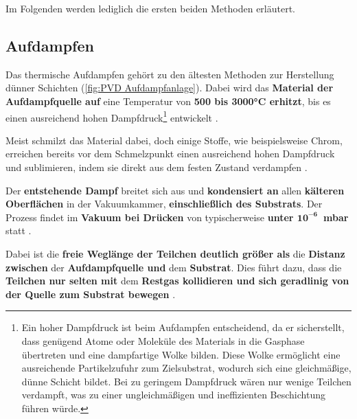 \documentclass{article} %
\begin{document}
Im Folgenden werden lediglich die ersten beiden Methoden erläutert.





\vspace{1em}

\subsection{Aufdampfen} %

Das thermische Aufdampfen gehört zu den ältesten Methoden zur Herstellung dünner Schichten (\autoref{fig:PVD Aufdampfanlage}). Dabei wird das \textbf{Material der Aufdampfquelle auf} eine Temperatur von \textbf{500 bis 3000°C erhitzt}, bis es einen ausreichend hohen Dampfdruck\footnote{Ein hoher Dampfdruck ist beim Aufdampfen entscheidend, da er sicherstellt, dass genügend Atome oder Moleküle des Materials in die Gasphase übertreten und eine dampfartige Wolke bilden. Diese Wolke ermöglicht eine ausreichende Partikelzufuhr zum Zielsubstrat, wodurch sich eine gleichmäßige, dünne Schicht bildet. Bei zu geringem Dampfdruck wären nur wenige Teilchen verdampft, was zu einer ungleichmäßigen und ineffizienten Beschichtung führen würde.} entwickelt \cite{keplinger2024}.

\vspace{1em}

Meist schmilzt das Material dabei, doch einige Stoffe, wie beispielsweise Chrom, erreichen bereits vor dem Schmelzpunkt einen ausreichend hohen Dampfdruck und sublimieren, indem sie direkt aus dem festen Zustand verdampfen \cite{keplinger2024}.

\vspace{1em}

Der \textbf{entstehende Dampf} breitet sich aus und \textbf{kondensiert an} allen \textbf{kälteren Oberflächen} in der Vakuumkammer, \textbf{einschließlich des Substrats}. Der Prozess findet im \textbf{Vakuum bei Drücken} von typischerweise \textbf{unter $\mathbf{10^{-6}}$~mbar} statt \cite{keplinger2024}.

\vspace{1em}

Dabei ist die \textbf{freie Weglänge der Teilchen deutlich größer als} die \textbf{Distanz zwischen} der \textbf{Aufdampfquelle und} dem \textbf{Substrat}. Dies führt dazu, dass die \textbf{Teilchen nur selten mit} dem \textbf{Restgas kollidieren und sich geradlinig von der Quelle zum Substrat bewegen} \cite{keplinger2024}.
\end{document}
